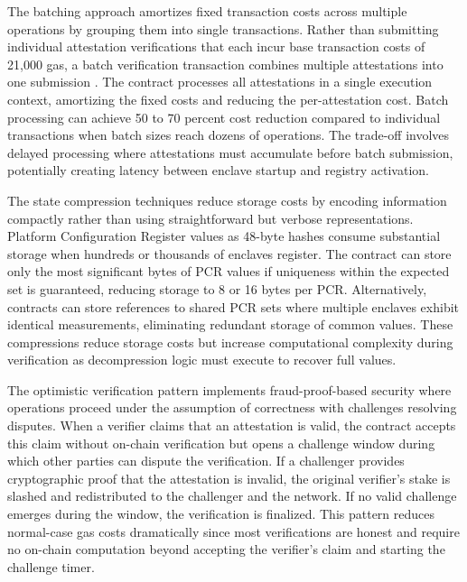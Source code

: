 The batching approach amortizes fixed transaction costs across multiple operations by grouping them into single transactions. Rather than submitting individual attestation verifications that each incur base transaction costs of 21,000 gas, a batch verification transaction combines multiple attestations into one submission \cite{gas_optimization}. The contract processes all attestations in a single execution context, amortizing the fixed costs and reducing the per-attestation cost. Batch processing can achieve 50 to 70 percent cost reduction compared to individual transactions when batch sizes reach dozens of operations. The trade-off involves delayed processing where attestations must accumulate before batch submission, potentially creating latency between enclave startup and registry activation.

The state compression techniques reduce storage costs by encoding information compactly rather than using straightforward but verbose representations. Platform Configuration Register values as 48-byte hashes consume substantial storage when hundreds or thousands of enclaves register. The contract can store only the most significant bytes of PCR values if uniqueness within the expected set is guaranteed, reducing storage to 8 or 16 bytes per PCR. Alternatively, contracts can store references to shared PCR sets where multiple enclaves exhibit identical measurements, eliminating redundant storage of common values. These compressions reduce storage costs but increase computational complexity during verification as decompression logic must execute to recover full values.

The optimistic verification pattern implements fraud-proof-based security where operations proceed under the assumption of correctness with challenges resolving disputes. When a verifier claims that an attestation is valid, the contract accepts this claim without on-chain verification but opens a challenge window during which other parties can dispute the verification. If a challenger provides cryptographic proof that the attestation is invalid, the original verifier's stake is slashed and redistributed to the challenger and the network. If no valid challenge emerges during the window, the verification is finalized. This pattern reduces normal-case gas costs dramatically since most verifications are honest and require no on-chain computation beyond accepting the verifier's claim and starting the challenge timer.

